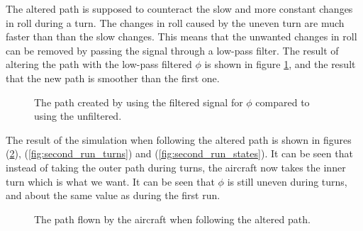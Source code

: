 The altered path is supposed to counteract the slow and more constant changes in roll during a turn. The changes in roll caused by the uneven turn are much faster than than the slow changes. This means that the unwanted changes in roll can be removed by passing the signal through a low-pass filter. The result of altering the path with the low-pass filtered $\phi$ is shown in figure \ref{fig:filtered_vs_unfiltered}, and the result that the new path is smoother than the first one.

\begin{figure}[!ht]
    \centering
    \caption{The path created by using the filtered signal for $\phi$ compared to using the unfiltered.}
	\label{fig:filtered_vs_unfiltered}
\end{figure}

The result of the simulation when following the altered path is shown in figures (\ref{fig:second_run_path}), (\ref{fig:second_run_turns}) and (\ref{fig:second_run_states}). It can be seen that instead of taking the outer path during turns, the aircraft now takes the inner turn which is what we want. It can be seen that $\phi$ is still uneven during turns, and about the same value as during the first run.

\begin{figure}[!ht]
    \centering
    \caption{The path flown by the aircraft when following the altered path.}
	\label{fig:second_run_path}
\end{figure}

